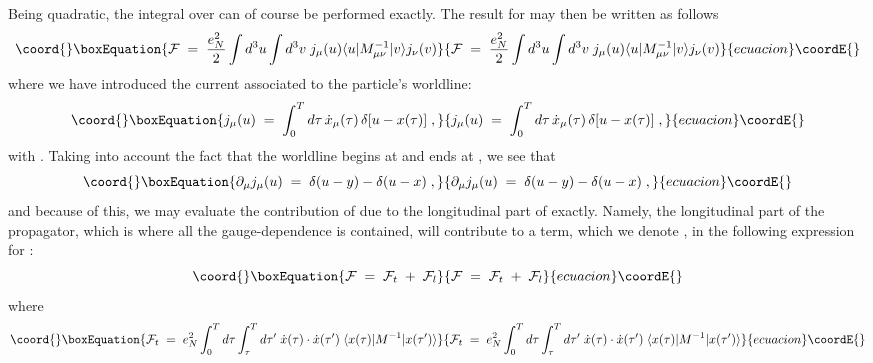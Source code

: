 \documentclass[12pt,a4paper]{article} \usepackage[latin1] {inputenc}
\begin{document}
Being \coordHE{} quadratic, the integral over \coordHE{} can of course be
performed exactly. The result for \coordHE{} may then be written
as follows
\begin{equation}\coord{}\boxEquation{\label{eq:eff1}
{\mathcal F} \;=\; \frac{e_N^2}{2} \int d^3u \int d^3v \;
j_\mu(u) \langle u |M^{-1}_{\mu\nu}|v\rangle j_\nu(v) 
}{{\mathcal F} \;=\; \frac{e_N^2}{2} \int d^3u \int d^3v \;
j_\mu(u) \langle u |M^{-1}_{\mu\nu}|v\rangle j_\nu(v) 
}{ecuacion}\coordE{}\end{equation}
where we have introduced the current \coordHE{} associated to the
particle's worldline:
\begin{equation}\coord{}\boxEquation{
j_\mu (u) \;=\; \int_0^T d\tau \, {\dot x}_\mu(\tau) \, \delta[u -
x(\tau)] \;,
}{
j_\mu (u) \;=\; \int_0^T d\tau \, {\dot x}_\mu(\tau) \, \delta[u -
x(\tau)] \;,
}{ecuacion}\coordE{}\end{equation}
with \coordHE{}. Taking into account the
fact that the worldline begins at \coordHE{} and ends at \coordHE{}, we see that
\begin{equation}\coord{}\boxEquation{
\partial_\mu j_\mu (u) \;=\; \delta (u - y) - \delta (u - x) \;,
}{
\partial_\mu j_\mu (u) \;=\; \delta (u - y) - \delta (u - x) \;,
}{ecuacion}\coordE{}\end{equation}
and because of this, we may evaluate the contribution of \coordHE{} due to the longitudinal part of \coordHE{} exactly.
Namely, the longitudinal part of the propagator, which is where all
the gauge-dependence is contained, will contribute to a term, which we
denote \coordHE{}, in the following expression for \coordHE{}:
\begin{equation}\coord{}\boxEquation{\label{eq:aux1}
{\mathcal F} \;=\; {\mathcal F}_t\;+\; {\mathcal F}_l
}{{\mathcal F} \;=\; {\mathcal F}_t\;+\; {\mathcal F}_l
}{ecuacion}\coordE{}\end{equation}
where
\begin{equation}\coord{}\boxEquation{\label{eq:eff2}
 {\mathcal F}_t\;=\; e_N^2 \int_0^T d\tau \int_\tau^T d\tau' \; 
{\dot x}(\tau) \cdot {\dot x}(\tau') \; 
\langle x(\tau) | M^{-1} | x(\tau') \rangle
}{{\mathcal F}_t\;=\; e_N^2 \int_0^T d\tau \int_\tau^T d\tau' \; 
{\dot x}(\tau) \cdot {\dot x}(\tau') \; 
\langle x(\tau) | M^{-1} | x(\tau') \rangle
}{ecuacion}\coordE{}\end{equation}
\end{document}
